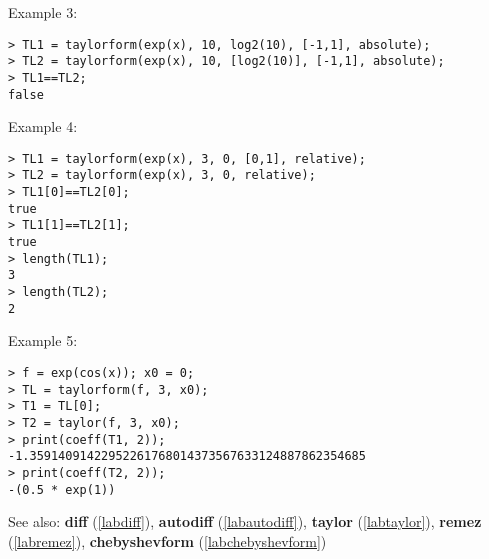\noindent Example 3: 
\begin{center}\begin{minipage}{15cm}\begin{Verbatim}[frame=single]
> TL1 = taylorform(exp(x), 10, log2(10), [-1,1], absolute);
> TL2 = taylorform(exp(x), 10, [log2(10)], [-1,1], absolute);
> TL1==TL2;
false
\end{Verbatim}
\end{minipage}\end{center}
\noindent Example 4: 
\begin{center}\begin{minipage}{15cm}\begin{Verbatim}[frame=single]
> TL1 = taylorform(exp(x), 3, 0, [0,1], relative);
> TL2 = taylorform(exp(x), 3, 0, relative);
> TL1[0]==TL2[0];
true
> TL1[1]==TL2[1];
true
> length(TL1);
3
> length(TL2);
2
\end{Verbatim}
\end{minipage}\end{center}
\noindent Example 5: 
\begin{center}\begin{minipage}{15cm}\begin{Verbatim}[frame=single]
> f = exp(cos(x)); x0 = 0;
> TL = taylorform(f, 3, x0);
> T1 = TL[0];
> T2 = taylor(f, 3, x0);
> print(coeff(T1, 2));
-1.35914091422952261768014373567633124887862354685
> print(coeff(T2, 2));
-(0.5 * exp(1))
\end{Verbatim}
\end{minipage}\end{center}
See also: \textbf{diff} (\ref{labdiff}), \textbf{autodiff} (\ref{labautodiff}), \textbf{taylor} (\ref{labtaylor}), \textbf{remez} (\ref{labremez}), \textbf{chebyshevform} (\ref{labchebyshevform})
